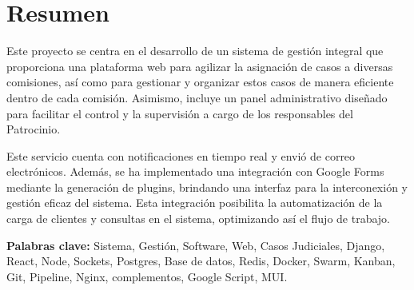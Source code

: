 \chapter*{Resumen}
Este proyecto se centra en el desarrollo de un sistema de gestión integral que proporciona una plataforma web para agilizar la asignación de casos a diversas comisiones, así como para gestionar y organizar estos casos de manera eficiente dentro de cada comisión. Asimismo, incluye un panel administrativo diseñado para facilitar el control y la supervisión a cargo de los responsables del Patrocinio.

Este servicio cuenta con notificaciones en tiempo real y envió de correo electrónicos. Además, se ha implementado una integración con Google Forms mediante la generación de plugins, brindando una interfaz para la interconexión y gestión eficaz del sistema. Esta integración posibilita la automatización de la carga de clientes y consultas en el sistema, optimizando así el flujo de trabajo.

\vspace{.5cm}

\textbf{Palabras clave:} Sistema, Gestión, Software, Web, Casos Judiciales, Django, React, Node, Sockets, Postgres, Base de datos, Redis, Docker, Swarm, Kanban, Git, Pipeline, Nginx, complementos, Google Script, MUI.